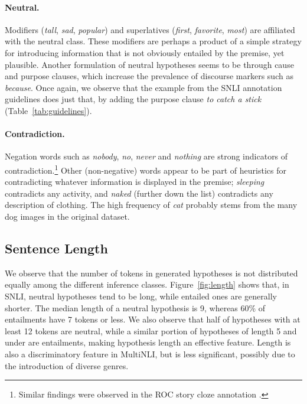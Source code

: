 \paragraph{Neutral.}
Modifiers (\textit{tall}, \textit{sad}, \textit{popular}) and superlatives (\textit{first}, \textit{favorite}, \textit{most}) are affiliated with the neutral class. 
These modifiers are perhaps a product of a simple strategy for introducing information that is not obviously entailed by the premise, yet plausible. 
Another formulation of neutral hypotheses seems to be through cause and purpose clauses, which increase the prevalence of discourse markers such as \textit{because}. %
Once again, we observe that the example from the SNLI annotation guidelines does just that, by adding the purpose clause \textit{to catch a stick} (Table~\ref{tab:guidelines}).

\paragraph{Contradiction.}
Negation words such as \textit{nobody}, \textit{no}, \textit{never} and \textit{nothing} 
are strong indicators of contradiction.\footnote{Similar findings were observed in the ROC story cloze annotation \cite{Schwartz:2017}.}
Other (non-negative) words appear to be part of heuristics for contradicting whatever information is displayed in the premise; \textit{sleeping} contradicts any activity, and \textit{naked} (further down the list) contradicts any description of clothing. 
The high frequency of \textit{cat} probably stems from the many dog images in the original dataset. 



\subsection{Sentence Length}
\label{ssec:length}

We observe that the number of tokens in generated hypotheses is not distributed equally among the different inference classes. 
Figure~\ref{fig:length} shows that, in SNLI, neutral hypotheses tend to be long, while entailed ones are generally shorter. 
The median length of a neutral hypothesis is 9, whereas 60\% of entailments have 7 tokens or less. 
We also observe that half of hypotheses with at least 12 tokens are neutral, while a similar portion of hypotheses of length 5 and under are entailments, making hypothesis length an effective feature. 
Length is also a discriminatory feature in MultiNLI, but is less significant, possibly due to the introduction of diverse genres.

